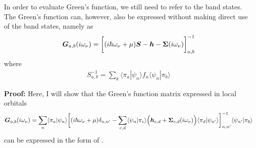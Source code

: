 \documentclass[11pt,a4paper]{report}
\begin{document}
In order to evaluate Green's function, we still need to refer to the
band states. The Green's function can, however, also be expressed
without making direct use of the band states, namely as
\begin{eqnarray}
\bm{G}_{a,b}(i\omega_\nu)
=\biggl[(i\hbar\omega_\nu+\mu)\bm{S}
-\bm{h}-\bm{\Sigma}(i\omega_\nu)\biggr]^{-1}
_{a,b}
\label{eq:greenlocform1}
\end{eqnarray}
where
\begin{eqnarray}
S^{-1}_{a,b}=\sum_k\langle\pi_a|\psi_n\rangle f_n\langle\psi_n|\pi_b\rangle
\label{eq:inverses}
\end{eqnarray}

\textbf{Proof:}
Here, I will show that the Green's function matrix expressed in local orbitals
\begin{eqnarray}
\bm{G}_{a,b}(i\omega_\nu)=
\sum_n\langle\pi_a|\psi_n\rangle
\biggl[
(i\hbar\omega_\nu+\mu)\delta_{n,n'}-
\sum_{c,d}\langle\psi_n|\pi_c\rangle
\Bigl(\bm{h}_{c,d}+\bm{\Sigma}_{c,d}(i\omega_\nu)\Bigr)
\langle\pi_d|\psi_{n'}\rangle
\biggr]^{-1}_{n,n'}
\langle\psi_{n'}|\pi_b\rangle
\nonumber\\
\label{eq:greenlocform2}
\end{eqnarray}
can be expressed in the form of .
\end{document}
